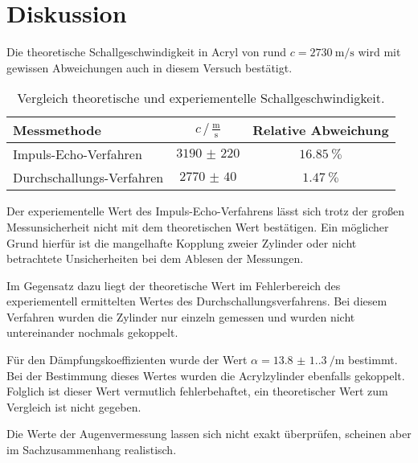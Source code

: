 \section{Diskussion}
\label{sec:Diskussion}
Die theoretische Schallgeschwindigkeit in Acryl von rund $c=\qty{2730}{\metre\per\second}$\cite{c_Acryl} wird mit gewissen Abweichungen
auch in diesem Versuch bestätigt.
\begin{table}[H]
    \centering
    \caption{Vergleich theoretische und experiementelle Schallgeschwindigkeit.}
    \begin{tabular}{l S[table-format=3.0] S[table-format=2.1]}
        \toprule
         {Messmethode} & {$c\,/\,\frac{\unit{\metre}}{\unit{\second}}$} & {Relative Abweichung} \\
        \midrule
           {Impuls-Echo-Verfahren}	&  {$\num{3190(220)}$} & {$\qty{16,85}{\percent}$}\\
           {Durchschallungs-Verfahren}	&  {$\num{2770(40)}$} & {$\qty{1,47}{\percent}$}\\
        \bottomrule 
    \end{tabular}
  \end{table}
Der experiementelle Wert des Impuls-Echo-Verfahrens lässt sich trotz der großen Messunsicherheit nicht mit dem theoretischen Wert bestätigen. 
Ein möglicher Grund hierfür ist die mangelhafte Kopplung zweier Zylinder oder nicht betrachtete Unsicherheiten bei dem Ablesen der Messungen.

Im Gegensatz dazu liegt der theoretische Wert im Fehlerbereich des experiementell ermittelten Wertes des Durchschallungsverfahrens. Bei diesem Verfahren
wurden die Zylinder nur einzeln gemessen und wurden nicht untereinander nochmals gekoppelt.

Für den Dämpfungskoeffizienten wurde der Wert $\alpha = \qty{13.8(1.3)}{\per\metre}$ bestimmt. Bei der Bestimmung dieses Wertes wurden die
Acrylzylinder ebenfalls gekoppelt. Folglich ist dieser Wert vermutlich fehlerbehaftet, ein theoretischer Wert zum Vergleich ist nicht gegeben.

Die Werte der Augenvermessung lassen sich nicht exakt überprüfen, scheinen aber im Sachzusammenhang realistisch.
